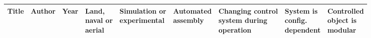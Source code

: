 \begin{tabular}{|l|l|l|l|l|l|l|l|l|}
	\hline	
	\textbf{Title} & \textbf{Author} & \textbf{Year} &\makecell{\textbf{Land,} \\ \textbf{naval or} \\ \textbf{aerial}} &  \makecell{\textbf{Simulation or} \\ \textbf{experimental}} & \makecell{\textbf{Automated} \\ \textbf{assembly}}  & \makecell{\textbf{Changing control} \\  \textbf{system during} \\ \textbf{operation}} & \makecell{\textbf{System is} \\ \textbf{config.} \\ \textbf{dependent}} & \makecell{\textbf{Controlled} \\ \textbf{object is} \\ \textbf{modular}}  \\ \hline	
		

\end{tabular}

